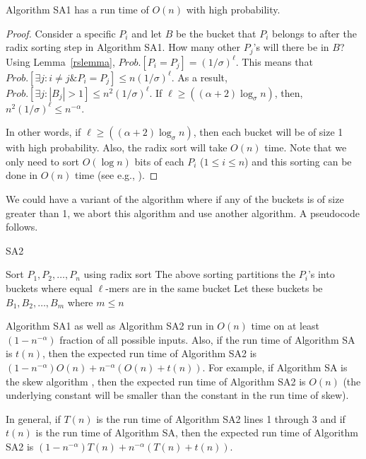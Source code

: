  
\begin{lemma}
Algorithm SA1 has a run time of $O(n)$ with high probability.
\end{lemma} 

\begin{proof}
Consider a specific $P_i$ and let $B$ be the bucket that $P_i$ belongs to after
the radix sorting step in Algorithm SA1. How many other $P_j$'s will there be
in $B$? Using Lemma~\ref{rslemma}, $Prob.[P_i=P_j]=(1/\sigma)^\ell$. This means
that $Prob.[\exists j: i\neq j \& P_i=P_j]\leq n(1/\sigma)^\ell$. As a result,
$Prob.[\exists j: |B_j|>1]\leq n^2(1/\sigma)^\ell$. If
$\ell\geq((\alpha+2)\log_\sigma n)$, then, $n^2(1/\sigma)^\ell\leq
n^{-\alpha}$.

In other words, if $\ell\geq((\alpha+2)\log_\sigma n)$, then each bucket will
be of size 1 with high probability. Also, the radix sort will take $O(n)$ time. Note that we only need to sort $O(\log n)$ bits of each $P_i$ ($1\leq i\leq n$) and this sorting can be done in $O(n)$ time (see e.g., \cite{HSR08}).
\end{proof}


 We could have a variant of the algorithm where if
any of the buckets is of size greater than 1, we abort this algorithm and use
another algorithm. A pseudocode follows.

{\LinesNumbered
\begin{algorithm}[H]
\caption{SA2} 

Sort $P_1,P_2,\ldots,P_n$ using radix sort\;
\nonl The above sorting partitions the $P_i$'s into buckets where equal
$\ell$-mers are in the same bucket\;
\nonl Let these buckets be $B_1,B_2,\ldots,B_m$ where $m\leq n$\;
\nonl{}
\end{algorithm}
}

 Algorithm SA1 as well as Algorithm SA2 run in
$O(n)$ time on at least $(1-n^{-\alpha})$ fraction of all possible inputs.
Also, if the run time of Algorithm SA is $t(n)$, then the expected run time of
Algorithm SA2 is $(1-n^{-\alpha})O(n)+n^{-\alpha}(O(n)+t(n))$. For example, if
Algorithm SA is the skew algorithm \cite{KaSa03}, then the expected run time
of Algorithm SA2 is $O(n)$ (the underlying constant will be smaller than the
constant in the run time of skew).


 In general, if $T(n)$ is the run time of
Algorithm SA2 lines 1 through 3 and if $t(n)$ is the run time of Algorithm SA,
then the expected run time of Algorithm SA2 is
$(1-n^{-\alpha})T(n)+n^{-\alpha}(T(n)+t(n))$.


